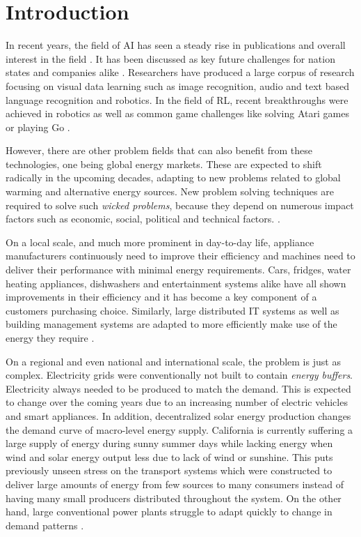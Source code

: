 \chapter{Introduction}



In recent years, the field of \ac{AI} has seen a steady rise in publications and overall interest in the field
\cite[]{arulkumaran2017brief, russell2016artificial}.
It has been discussed as key future challenges for nation states and companies alike
\cite[]{mozur_markoff_2017, faznetchina_2018}. Researchers have produced a large corpus of research focusing on visual
data learning such as image recognition, audio and text based language recognition and robotics. In the field of
\ac{RL}, recent breakthroughs were achieved in robotics as well as common game challenges like solving Atari games or
playing Go
\cite[]{arulkumaran2017brief}.

However, there are other problem fields that can also benefit from these technologies, one being global energy markets.
These are expected to shift radically in the upcoming decades, adapting to new problems related to global warming and
alternative energy sources. New problem solving techniques are required to solve such \emph{wicked
problems}, because they depend on numerous impact factors such as economic, social, political and technical factors.
\cite[]{ketter2015competitive}.

On a local scale, and much more prominent in day-to-day life, appliance manufacturers continuously need to improve their
efficiency and machines need to deliver their performance with minimal energy requirements. Cars, fridges, water heating
appliances, dishwashers and entertainment systems alike have all shown improvements in their efficiency and it has
become a key component of a customers purchasing choice.  Similarly, large distributed IT systems as well as building
management systems are adapted to more efficiently make use of the energy they require
\cite[]{Orgerie:2014:STI:2597757.2532637, DePaola:2014:IMS:2620784.2611779}.

On a regional and even national and international scale, the problem is just as complex. Electricity grids were
conventionally not built to contain \emph{energy buffers}. Electricity always needed to be produced to match the demand. This
is expected to change over the coming years due to an increasing number of electric vehicles and smart appliances. In
addition, decentralized solar energy production changes the demand curve of macro-level energy supply. California is
currently suffering a large supply of energy during sunny summer days while lacking energy when wind and solar energy
output less due to lack of wind or sunshine. This puts previously unseen stress on the transport systems which were
constructed to deliver large amounts of energy from few sources to many consumers instead of having many small producers
distributed throughout the system. On the other hand, large conventional power plants struggle to adapt quickly to
change in demand patterns
\cite[]{roberts_2016}.

